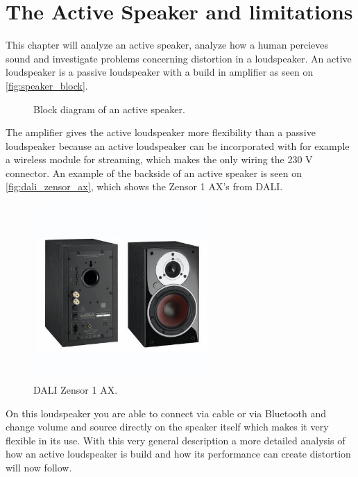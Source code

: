 


\chapter{The Active Speaker and limitations}
This chapter will analyze an active speaker, analyze how a human percieves sound and investigate problems concerning distortion in a loudspeaker. An active loudspeaker is a passive loudspeaker with a build in amplifier as seen on \autoref{fig:speaker_block}. \\
\begin{figure}[H]
\centering
{}

\caption{Block diagram of an active speaker.}
\label{fig:speaker_block}
\end{figure}
The amplifier gives the active loudspeaker more flexibility than a passive loudspeaker because an active loudspeaker can be incorporated with for example a wireless module for streaming, which makes the only wiring the 230 V connector. An example of the backside of an active speaker is seen on \autoref{fig:dali_zensor_ax}, which shows the Zensor 1 AX's from DALI.
\begin{figure}[H]
\centering
\includegraphics[width=0.6\textwidth]{figures/dali_zensor_1_ax.jpg}
\caption{DALI Zensor 1 AX.}
\label{fig:dali_zensor_ax}
\end{figure}
On this loudspeaker you are able to connect via cable or via Bluetooth and change volume and source directly on the speaker itself which makes it very flexible in its use. With this very general description a more detailed analysis of how an active loudspeaker is build and how its performance can create distortion will now follow. 

